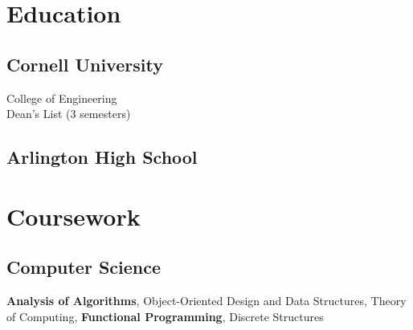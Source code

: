 \documentclass[]{deedy-resume-openfont}
\let\sectionold\section
\renewcommand{\section}[1]{
	\sectionold{\textcolor{sectiontitlecolor}{#1}}
}
\begin{document}
%
%

%
%



%
%

\begin{minipage}[t]{0.33\textwidth} 


\section{Education} 

\subsection{Cornell University}

College of Engineering \\
Dean's List (3 semesters) \\
\sectionsep

\subsection{Arlington High School}
\sectionsep



\section{Coursework}
\subsection{Computer Science}
\textbf{Analysis of Algorithms}, Object-Oriented Design and Data Structures, Theory of Computing, \textbf{Functional Programming}, Discrete Structures
\sectionsep


\end{minipage}
\end{document}
